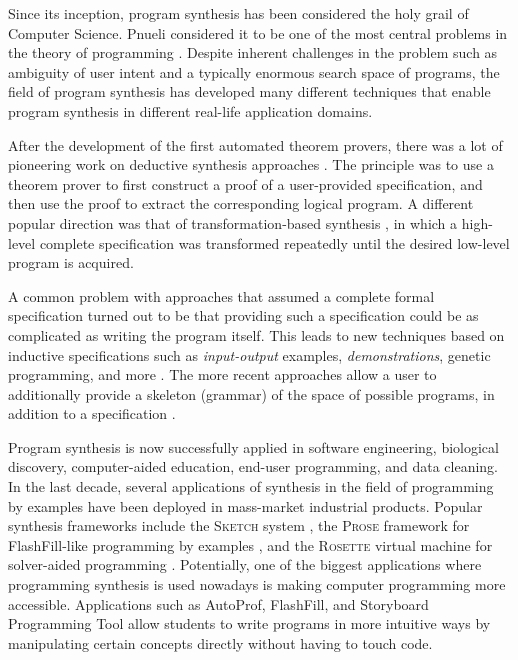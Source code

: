 Since its inception, program synthesis has been considered the holy grail of Computer Science. Pnueli considered it to be one of the most central problems in the theory of programming \cite{popl:1989:Pnueli}. Despite inherent challenges in the problem such as ambiguity of user intent and a typically enormous search space of programs, the ﬁeld of program synthesis has developed many diﬀerent techniques that enable program synthesis in diﬀerent real-life application domains.

After the development of the first automated theorem provers, there was a lot of pioneering work on deductive synthesis approaches \cite{ijcai:1969:Cordell,ijcai:1969:Waldinger,article:1971:Manna}. The principle was to use a theorem prover to first construct a proof of a user-provided specification, and then use the proof to extract the corresponding logical program. A different popular direction was that of transformation-based synthesis \cite{ijcai:1975:Manna}, in which a high-level complete specification was transformed repeatedly until the desired low-level program is acquired.

A common problem with approaches that assumed a complete formal specification turned out to be that providing such a specification could be as complicated as writing the program itself. This leads to new techniques based on inductive specifications such as \emph{input-output} examples, \emph{demonstrations}, genetic programming, and more \cite{ijcai:1975:Shaw,article:1977:Summers,thesis:Canfield,article:1994:Koza}. The more recent approaches allow a user to additionally provide a skeleton (grammar) of the space of possible programs, in addition to a specification \cite{fmcad:2013:Alur}.

Program synthesis is now successfully applied in software engineering, biological discovery, computer-aided education, end-user programming, and data cleaning. In the last decade, several applications of synthesis in the ﬁeld of programming by examples have been deployed in mass-market industrial products. Popular synthesis frameworks include the \textsc{Sketch} system \cite{book:2008:solar}, the \textsc{Prose} framework for FlashFill-like programming by examples \cite{popl:2011:Gulwani}, and the \textsc{Rosette} virtual machine for solver-aided programming \cite{onward:2013:Torlak}. Potentially, one of the biggest applications where programming synthesis is used nowadays is making computer programming more accessible. Applications such as AutoProf, FlashFill, and Storyboard Programming Tool allow students to write programs in more intuitive ways by manipulating certain concepts directly without having to touch code.


